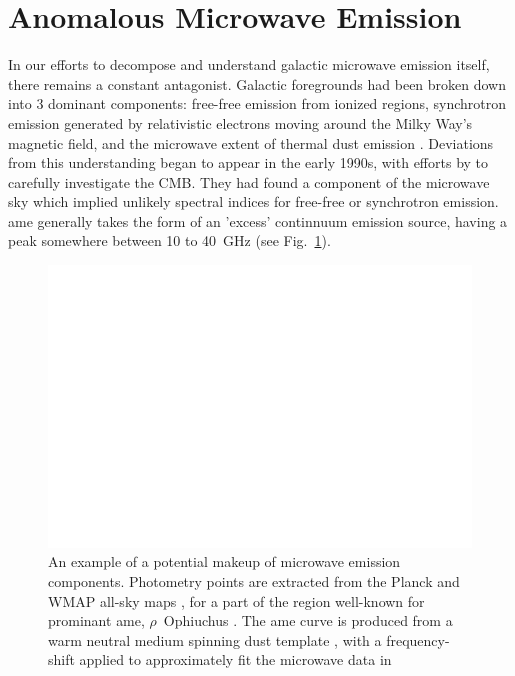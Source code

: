   \section{Anomalous Microwave Emission}
      In our efforts to decompose and understand galactic microwave emission itself, there remains a constant antagonist. Galactic foregrounds had been broken down into 3 dominant components: free-free emission from ionized regions, synchrotron emission generated by relativistic electrons moving around the Milky Way's magnetic field, and the microwave extent of thermal dust emission \citep{wmap03b, leach08, planckXII}. Deviations from this understanding began to appear in the early 1990s, with efforts by \cite{kogut96, leitch97} to carefully investigate the CMB. They had found a component of the microwave sky which implied unlikely spectral indices for free-free or synchrotron emission. \acrshort{ame} generally takes the form of an 'excess' continnuum emission source, having a peak somewhere between 10 to 40~GHz (see Fig.~\ref{fig:mw_foregrounds_demo_rOph}).
            \begin{figure}
              \centering
              \includegraphics[width=\textwidth]{../Plots/ch_intro/mw_foregrounds_demo_rOph.pdf}
                \caption{An example of a potential makeup of microwave emission components. Photometry points are extracted from the Planck and WMAP all-sky maps \citep{hfi14viii}, for a part of the region well-known for prominant \acrshort{ame}, $\rho$~Ophiuchus \citep{planckxx11}. The \acrshort{ame} curve is produced from a warm neutral medium spinning dust template \citep{ali-haimoud09}, with a frequency-shift applied to approximately fit the microwave data in \cite{planck15X}}
              \label{fig:mw_foregrounds_demo_rOph}
            \end{figure}
